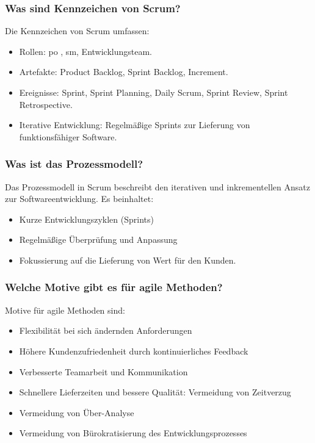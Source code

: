 \documentclass[main.tex]{subfiles}
\begin{document}
\subsubsection*{Was sind Kennzeichen von Scrum?} %
Die Kennzeichen von Scrum umfassen:
\begin{itemize}
    \item Rollen: \gls{po} , \gls{sm}, Entwicklungsteam.
    \item Artefakte: \gls{Product Backlog}, \gls{Sprint Backlog}, Increment.
    \item Ereignisse: \gls{Sprint}, \gls{Sprint Planning}, \gls{Daily Scrum}, \gls{Sprint Review}, \gls{Sprint Retrospective}.
    \item Iterative Entwicklung: Regelmäßige \glspl{Sprint} zur Lieferung von funktionsfähiger Software.
\end{itemize}

\subsubsection*{Was ist das Prozessmodell?}
Das Prozessmodell in Scrum beschreibt den iterativen und inkrementellen Ansatz zur Softwareentwicklung. Es beinhaltet:
\begin{itemize}
    \item Kurze Entwicklungszyklen (\glspl{Sprint})
    \item Regelmäßige Überprüfung und Anpassung
    \item Fokussierung auf die Lieferung von Wert für den Kunden.
\end{itemize}

\subsubsection*{Welche Motive gibt es für agile Methoden?} %
Motive für agile Methoden sind:
\begin{itemize}
    \item Flexibilität bei sich ändernden Anforderungen
    \item Höhere Kundenzufriedenheit durch kontinuierliches Feedback
    \item Verbesserte Teamarbeit und Kommunikation
    \item Schnellere Lieferzeiten und bessere Qualität: Vermeidung von Zeitverzug 
    \item Vermeidung von Über-Analyse
    \item Vermeidung von Bürokratisierung des Entwicklungsprozesses
\end{itemize}
\end{document}
